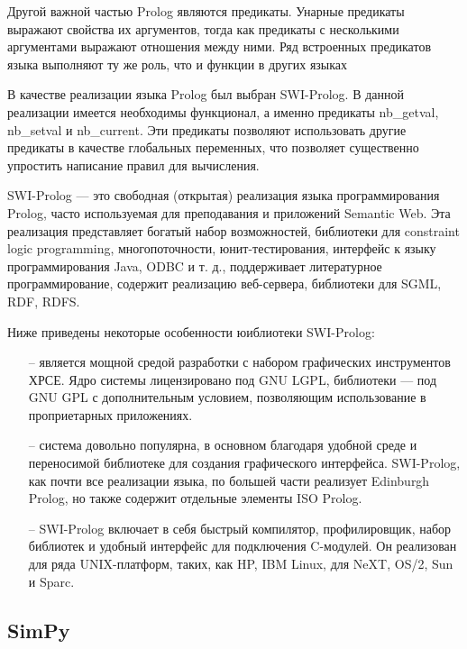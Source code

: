 		Другой важной частью Prolog являются предикаты. Унарные предикаты выражают свойства их аргументов, тогда как предикаты с несколькими аргументами выражают отношения между ними. Ряд встроенных предикатов языка выполняют ту же роль, что и функции в других языках

		В качестве реализации языка Prolog был выбран SWI-Prolog.
			В данной реализации имеется необходимы функционал, а именно предикаты nb\_getval, nb\_setval и nb\_current.
			Эти предикаты позволяют использовать другие предикаты в качестве глобальных переменных, что
			позволяет существенно упростить написание правил для вычисления.

		SWI-Prolog — это свободная (открытая) реализация языка программирования \\ Prolog, часто используемая для преподавания и приложений Semantic Web. Эта реализация представляет богатый набор возможностей, библиотеки для constraint logic programming, многопоточности, юнит-тестирования, интерфейс к языку программирования Java, ODBC и т. д., поддерживает литературное программирование, содержит реализацию веб-сервера, библиотеки для SGML, RDF, RDFS. 
        
        Ниже приведены некоторые особенности юиблиотеки SWI-Prolog:
       
\begin{itemize}
   \item[--]   является мощной средой разработки с набором графических инструментов ХРСЕ. Ядро системы лицензировано под GNU LGPL, библиотеки — под GNU GPL с дополнительным условием, позволяющим использование в проприетарных приложениях. 

    \item[--] система довольно популярна, в основном благодаря удобной среде и переносимой библиотеке для создания графического интерфейса. SWI-Prolog, как почти все реализации языка, по большей части реализует Edinburgh Prolog, но также содержит отдельные элементы ISO Prolog.

    \item[--] SWI-Prolog включает в себя быстрый компилятор, профилировщик, набор библиотек и удобный интерфейс для подключения C-модулей. Он реализован для ряда UNIX-платформ, таких, как HP, IBM Linux, для NeXT, OS/2, Sun и Sparc.
\end{itemize}

\subsection{SimPy}

